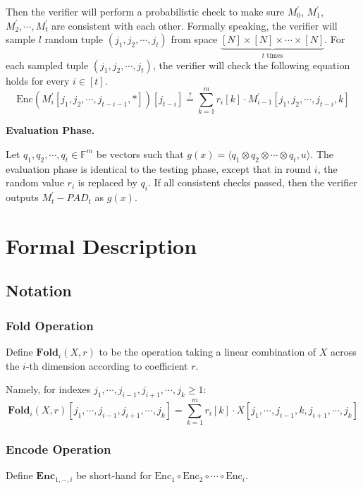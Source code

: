 Then the verifier will perform a probabilistic check to make sure 
$M_0^\prime$, $M_1^\prime$, $M_2^\prime, \cdots, M_{t}^\prime$ are consistent with each other. Formally speaking, the verifier will sample $l$ random tuple $(j_1, j_2, \cdots, j_t)$ from space $\underbrace{[N] \times [N] \times \cdots \times [N]}_{t \text{ times}}$. 
For each sampled tuple $(j_1, j_2, \cdots, j_t)$, the verifier will check the following equation holds for every $i \in [t]$.
$$
    \text{Enc}(M_i^\prime[j_1, j_2, \cdots, j_{t-i-1}, *])[j_{t-i}] \stackrel{?}{=} \sum_{k=1}^m r_i[k] \cdot M_{i-1}^{\prime}[j_1,j_2, \cdots, j_{t-i},k]
$$


\textbf{Evaluation Phase.}

Let $q_1, q_2, \cdots, q_t \in \mathbb{F}^{m}$ be vectors such that $g(x) =\langle q_1 \otimes q_2 \otimes \cdots \otimes q_t, u \rangle $. The evaluation phase is identical to the testing phase, except that in round $i$, the random value $r_i$ is replaced by $q_i$. If all consistent checks passed, then the verifier outputs $M_{t}^{\prime} - PAD_t$ as $g(x)$.

\section{Formal Description}

\subsection{Notation}

\subsubsection{Fold Operation}

Define $\textbf{Fold}_i(X, r)$ to be the operation taking a linear combination of $X$ across the $i$-th dimension according to coefficient $r$. 

Namely, for indexes $j_1, \cdots, j_{i-1}, j_{i+1}, \cdots , j_{k} \ge 1$:
$$
\textbf{Fold}_i(X, r)[j_1, \cdots, j_{i-1}, j_{i+1}, \cdots , j_{k}] = \sum_{k=1}^{m} r_{i}[k] \cdot X[j_1, \cdots, j_{i-1}, k, j_{i+1}, \cdots , j_{k}]
$$

\subsubsection{Encode Operation}

Define $\textbf{Enc}_{1,\cdots,i}$ be short-hand for $\text{Enc}_1 \circ \text{Enc}_2 \circ \cdots \circ \text{Enc}_{i}$.

